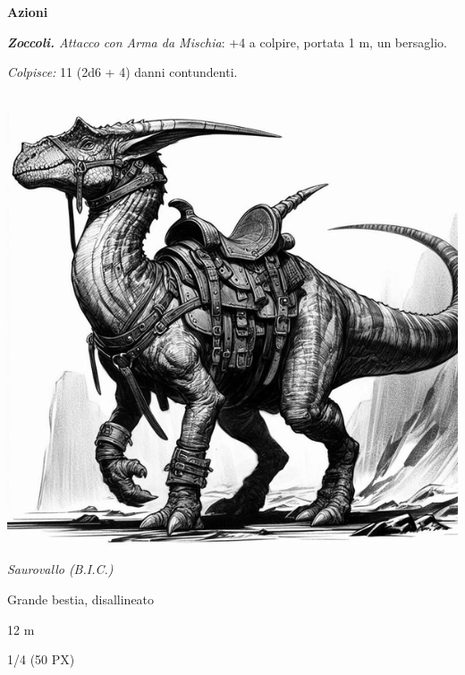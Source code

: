 \begin{multicols}{2}
{\textbf{Azioni}

\emph{\textbf{Zoccoli.} Attacco con Arma da Mischia}: +4 a colpire, portata 1 m, un bersaglio.

\emph{Colpisce:} 11 (2d6 + 4) danni contundenti.


\begin{center}
\includegraphics[width=0.85\linewidth]{immagini/saurovallo2-ai.png}

\emph{Saurovallo (B.I.C.)}
\end{center}

\begin{description}[noitemsep, topsep=0pt, parsep=0pt, partopsep=0pt, itemsep=1pt, leftmargin=2.35cm,  labelwidth=2.2cm, itemindent=0cm, listparindent=0pt] %
\setlength{\baselineskip}{10pt}
\item[\textbf{Taglia/Tipo}] Grande bestia, disallineato
\item[\textbf{Caratt.}] 
\item[\textbf{Punti Ferita}] 
\item[\textbf{Tiri Salvez.}] 
\item[\textbf{Movimento}] 12 m
\item[\textbf{Sfida}] 1/4 (50 PX)
\end{description}
\smallskip

}
\end{multicols}
